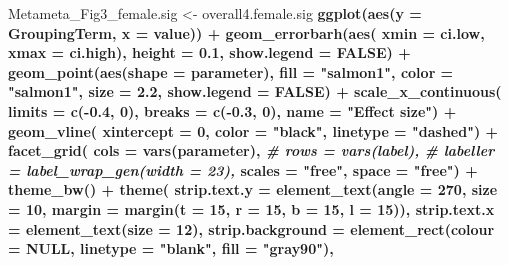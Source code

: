 \documentclass[]{article}
\newenvironment{Shaded}{\begin{snugshade}}{\end{snugshade}}
\newcommand{\CommentTok}[1]{\textcolor[rgb]{0.56,0.35,0.01}{\textit{#1}}}
\newcommand{\DataTypeTok}[1]{\textcolor[rgb]{0.13,0.29,0.53}{#1}}
\newcommand{\DecValTok}[1]{\textcolor[rgb]{0.00,0.00,0.81}{#1}}
\newcommand{\FloatTok}[1]{\textcolor[rgb]{0.00,0.00,0.81}{#1}}
\newcommand{\KeywordTok}[1]{\textcolor[rgb]{0.13,0.29,0.53}{\textbf{#1}}}
\newcommand{\NormalTok}[1]{#1}
\newcommand{\OperatorTok}[1]{\textcolor[rgb]{0.81,0.36,0.00}{\textbf{#1}}}
\newcommand{\OtherTok}[1]{\textcolor[rgb]{0.56,0.35,0.01}{#1}}
\newcommand{\StringTok}[1]{\textcolor[rgb]{0.31,0.60,0.02}{#1}}
\begin{document}
\begin{Shaded}
\begin{Highlighting}[]
{{{{{{{{{{{{{{{{{{{{{{{{{{{{{{{{{{{{{{{{{{{{{{{{{{{{{{{{{{{{{{{{{{{{{{{{{{{{{{{{{{{{{{{{\NormalTok{Metameta_Fig3_female.sig  <-}\StringTok{ }\NormalTok{overall4.female.sig }\OperatorTok{%>%}
\StringTok{  }\KeywordTok{ggplot}\NormalTok{(}\KeywordTok{aes}\NormalTok{(}\DataTypeTok{y =}\NormalTok{ GroupingTerm, }\DataTypeTok{x =}\NormalTok{ value)) }\OperatorTok{+}
\StringTok{  }\KeywordTok{geom_errorbarh}\NormalTok{(}\KeywordTok{aes}\NormalTok{(}
    \DataTypeTok{xmin =}\NormalTok{ ci.low,}
    \DataTypeTok{xmax =}\NormalTok{ ci.high),}
  \DataTypeTok{height =} \FloatTok{0.1}\NormalTok{, }\DataTypeTok{show.legend =} \OtherTok{FALSE}\NormalTok{) }\OperatorTok{+}
\StringTok{  }\KeywordTok{geom_point}\NormalTok{(}\KeywordTok{aes}\NormalTok{(}\DataTypeTok{shape =}\NormalTok{ parameter),}
    \DataTypeTok{fill =} \StringTok{"salmon1"}\NormalTok{, }\DataTypeTok{color =} \StringTok{"salmon1"}\NormalTok{, }\DataTypeTok{size =} \FloatTok{2.2}\NormalTok{,}
    \DataTypeTok{show.legend =} \OtherTok{FALSE}\NormalTok{) }\OperatorTok{+}
\StringTok{  }\KeywordTok{scale_x_continuous}\NormalTok{(}
    \DataTypeTok{limits =} \KeywordTok{c}\NormalTok{(}\OperatorTok{-}\FloatTok{0.4}\NormalTok{, }\DecValTok{0}\NormalTok{),}
    \DataTypeTok{breaks =} \KeywordTok{c}\NormalTok{(}\OperatorTok{-}\FloatTok{0.3}\NormalTok{, }\DecValTok{0}\NormalTok{),}
    \DataTypeTok{name =} \StringTok{"Effect size"}\NormalTok{) }\OperatorTok{+}
\StringTok{  }\KeywordTok{geom_vline}\NormalTok{(}
    \DataTypeTok{xintercept =} \DecValTok{0}\NormalTok{,}
    \DataTypeTok{color =} \StringTok{"black"}\NormalTok{,}
    \DataTypeTok{linetype =} \StringTok{"dashed"}\NormalTok{) }\OperatorTok{+}
\StringTok{  }\KeywordTok{facet_grid}\NormalTok{(}
    \DataTypeTok{cols =} \KeywordTok{vars}\NormalTok{(parameter), }\CommentTok{# rows = vars(label),}
    \CommentTok{# labeller = label_wrap_gen(width = 23),}
    \DataTypeTok{scales =} \StringTok{"free"}\NormalTok{,}
    \DataTypeTok{space =} \StringTok{"free"}\NormalTok{) }\OperatorTok{+}
\StringTok{  }\KeywordTok{theme_bw}\NormalTok{() }\OperatorTok{+}
\StringTok{  }\KeywordTok{theme}\NormalTok{(}
    \DataTypeTok{strip.text.y =} \KeywordTok{element_text}\NormalTok{(}\DataTypeTok{angle =} \DecValTok{270}\NormalTok{, }\DataTypeTok{size =} \DecValTok{10}\NormalTok{, }\DataTypeTok{margin =} \KeywordTok{margin}\NormalTok{(}\DataTypeTok{t =} \DecValTok{15}\NormalTok{, }\DataTypeTok{r =} \DecValTok{15}\NormalTok{, }\DataTypeTok{b =} \DecValTok{15}\NormalTok{, }\DataTypeTok{l =} \DecValTok{15}\NormalTok{)),}
    \DataTypeTok{strip.text.x =} \KeywordTok{element_text}\NormalTok{(}\DataTypeTok{size =} \DecValTok{12}\NormalTok{),}
    \DataTypeTok{strip.background =} \KeywordTok{element_rect}\NormalTok{(}\DataTypeTok{colour =} \OtherTok{NULL}\NormalTok{, }\DataTypeTok{linetype =} \StringTok{"blank"}\NormalTok{, }\DataTypeTok{fill =} \StringTok{"gray90"}\NormalTok{),}
}}}}}}}}}}}}}}}}}}}}}}}}}}}}}}}}}}}}}}}}}}}}}}}}}}}}}}}}}}}}}}}}}}}}}}}}}}}}}}}}}}}}}}}}}
\end{Highlighting}
\end{Shaded}
\end{document}
